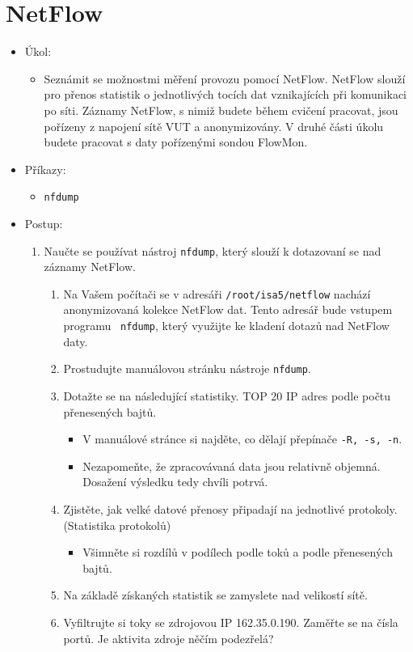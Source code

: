\newpage

\section{NetFlow}
\begin{itemize}
	\item Úkol:
	\begin{itemize}
		\item Seznámit se možnostmi měření provozu pomocí NetFlow. NetFlow slouží pro
		přenos statistik o jednotlivých tocích dat vznikajících při komunikaci po síti.
		Záznamy NetFlow, s nimiž budete během cvičení pracovat, jsou
		pořízeny z napojení sítě VUT a anonymizovány. V druhé části úkolu
		budete pracovat s daty pořízenými sondou FlowMon.
	\end{itemize}
	\item Příkazy:
	\begin{itemize}
		\item {\tt nfdump}
	\end{itemize}
	\item Postup:
	\begin{enumerate}
		\item Naučte se používat nástroj {\tt nfdump}, který slouží k dotazovaní se nad záznamy NetFlow.
		\begin{enumerate}
			\item Na Vašem počítači se v adresáři {\tt /root/isa5/netflow} nachází
			anonymizovaná kolekce NetFlow dat. Tento adresář bude vstupem programu
			{\tt
nfdump}, který využijte ke kladení dotazů nad NetFlow daty.
			\item Prostudujte manuálovou stránku nástroje {\tt nfdump}.
			\item Dotažte se na následující statistiky. TOP 20 IP adres podle počtu přenesených bajtů. 
			\begin{itemize}
				\item V manuálové stránce si najděte, co dělají přepínače {\tt -R, -s, -n}.
				\item Nezapomeňte, že zpracovávaná data jsou relativně objemná. Dosažení výsledku tedy chvíli potrvá.
			\end{itemize}
			\item Zjistěte, jak velké datové přenosy připadají na jednotlivé protokoly. (Statistika protokolů)
			\begin{itemize}
				\item Všimněte si rozdílů v podílech podle toků a podle přenesených bajtů.
			\end{itemize}
			\item Na základě získaných statistik se zamyslete nad velikostí sítě.
			\item Vyfiltrujte si toky se zdrojovou IP 162.35.0.190. Zaměřte se na čísla portů.
			Je aktivita zdroje něčím podezřelá?
		\end{enumerate}
	\end{enumerate}
\end{itemize}

